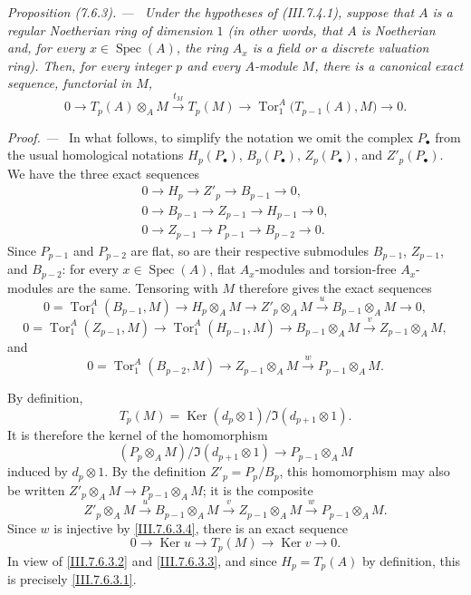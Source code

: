\documentclass[10pt,oneside]{book}
\newcommand{\Spec}{\operatorname{Spec}}
\newcommand{\Tor}{\operatorname{Tor}}
\newcommand{\Ker}{\operatorname{Ker}}
\newcommand{\sref}[2][]{(#2)}
\newenvironment{proposition}[1][]{\par\medskip\noindent\itshape Proposition (#1). ---\ }{\par}
\newenvironment{proof}{\par\medskip\noindent\textit{Proof. ---\ }}{\par}
\begin{document}
\begin{proposition}[7.6.3]
\label{III.7.6.3}
Under the hypotheses of \sref{III.7.4.1}, suppose that $A$ is
a regular Noetherian ring of dimension $1$ (in other words,
that $A$ is Noetherian and, for every $x\in\Spec(A)$, the ring
$A_x$ is a field or a discrete valuation ring).  Then, for
every integer $p$ and every $A$-module $M$, there is a
canonical exact sequence, functorial in $M$,
\[
  0
  \longrightarrow T_p(A)\otimes_A M
  \xrightarrow{t_M} T_p(M)
  \longrightarrow
  \Tor_1^A\bigl(T_{p-1}(A),M\bigr)
  \longrightarrow 0.
  \tag{7.6.3.1}\label{III.7.6.3.1}
\]
\end{proposition}

\begin{proof}
In what follows, to simplify the notation we omit the complex
$P_\bullet$ from the usual homological notations
$H_p(P_\bullet)$, $B_p(P_\bullet)$, $Z_p(P_\bullet)$, and
$Z'_p(P_\bullet)$.  We have the three exact sequences
\begin{gather*}
  0\longrightarrow H_p\longrightarrow Z'_p
  \longrightarrow B_{p-1}\longrightarrow 0,\\
  0\longrightarrow B_{p-1}\longrightarrow Z_{p-1}
  \longrightarrow H_{p-1}\longrightarrow 0,\\
  0\longrightarrow Z_{p-1}\longrightarrow P_{p-1}
  \longrightarrow B_{p-2}\longrightarrow 0.
\end{gather*}
Since $P_{p-1}$ and $P_{p-2}$ are flat, so are their
respective submodules $B_{p-1}$, $Z_{p-1}$, and $B_{p-2}$:
for every $x\in\Spec(A)$, flat $A_x$-modules and torsion-free
$A_x$-modules are the same.  Tensoring with $M$ therefore
gives the exact sequences
\[
  0=\Tor_1^A(B_{p-1},M)
  \longrightarrow H_p\otimes_A M
  \longrightarrow Z'_p\otimes_A M
  \xrightarrow{u}B_{p-1}\otimes_A M
  \longrightarrow 0,
  \tag{7.6.3.2}\label{III.7.6.3.2}
\]
\[
  0=\Tor_1^A(Z_{p-1},M)
  \longrightarrow \Tor_1^A(H_{p-1},M)
  \longrightarrow B_{p-1}\otimes_A M
  \xrightarrow{v} Z_{p-1}\otimes_A M,
  \tag{7.6.3.3}\label{III.7.6.3.3}
\]
and
\[
  0=\Tor_1^A(B_{p-2},M)
  \longrightarrow Z_{p-1}\otimes_A M
  \xrightarrow{w}P_{p-1}\otimes_A M.
  \tag{7.6.3.4}\label{III.7.6.3.4}
\]

By definition,
\[
  T_p(M)=
  \Ker(d_p\otimes 1)/\Im(d_{p+1}\otimes 1).
\]
It is therefore the kernel of the homomorphism
\[
  (P_p\otimes_A M)/\Im(d_{p+1}\otimes 1)
  \longrightarrow P_{p-1}\otimes_A M
\]
induced by $d_p\otimes 1$.  By the definition
$Z'_p=P_p/B_p$, this homomorphism may also be written
$Z'_p\otimes_A M\to P_{p-1}\otimes_A M$; it is the composite
\[
  Z'_p\otimes_A M
  \xrightarrow{u}B_{p-1}\otimes_A M
  \xrightarrow{v}Z_{p-1}\otimes_A M
  \xrightarrow{w}P_{p-1}\otimes_A M.
\]
Since $w$ is injective by \eqref{III.7.6.3.4}, there is an
exact sequence
\[
  0\longrightarrow\Ker u\longrightarrow T_p(M)
  \longrightarrow\Ker v\longrightarrow 0.
\]
In view of \eqref{III.7.6.3.2} and
\eqref{III.7.6.3.3}, and since $H_p=T_p(A)$ by definition,
this is precisely \eqref{III.7.6.3.1}.
\end{proof}
\end{document}
